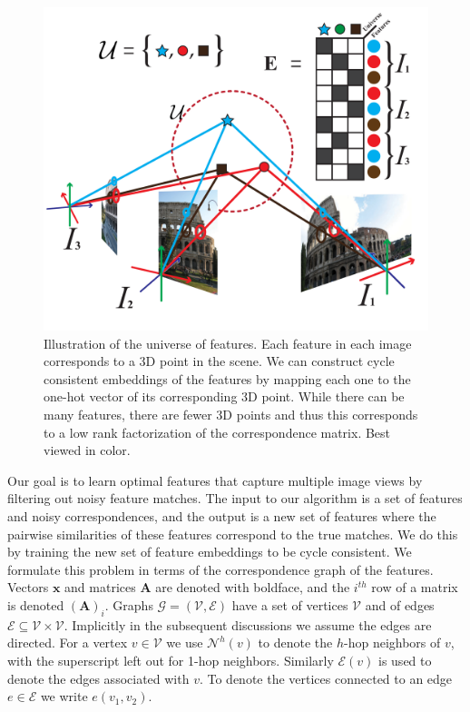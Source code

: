 \documentclass[10pt,twocolumn,letterpaper]{article}
\newcommand{\mat}[1]{\mathbf{#1}}
\begin{document}
\begin{figure}[t]
\begin{center}
  \includegraphics[width=0.9\linewidth]{figures-UniverseOfFeatures-v2.pdf}
\end{center}
  \caption{
    Illustration of the universe of features.
    Each feature in each image corresponds to a 3D point in the scene.
    We can construct cycle consistent embeddings of the features by mapping each one to the one-hot vector of its corresponding 3D point.
    While there can be many features, there are fewer 3D points and thus this corresponds to a low rank factorization of the correspondence matrix.
    Best viewed in color.
  }
\label{fig:universefeatures}
\label{fig:onecol}
\end{figure}
Our goal is to learn optimal features that capture multiple image views by filtering out noisy feature matches.
The input to our algorithm is a set of features and noisy correspondences, and the output is a new set of features where the pairwise similarities of these features correspond to the true matches.
We do this by training the new set of feature embeddings to be cycle consistent.
We formulate this problem in terms of the correspondence graph of the features.
Vectors $\mat{x}$ and matrices $\mat{A}$ are denoted with boldface, and the $i^{th}$ row of a matrix is denoted $(\mat{A})_i$.
Graphs $\mathcal{G} = (\mathcal{V}, \mathcal{E})$ have a set of vertices $\mathcal{V}$ and of edges $\mathcal{E} \subseteq \mathcal{V} \times \mathcal{V}$.
Implicitly in the subsequent discussions we assume the edges are directed.
For a vertex $v \in \mathcal{V}$ we use $\mathcal{N}^{h}(v)$ to denote the $h$-hop neighbors of $v$, with the superscript left out for 1-hop neighbors.
Similarly $\mathcal{E}(v)$ is used to denote the edges associated with $v$.
To denote the vertices connected to an edge $e \in \mathcal{E}$ we write $e(v_1, v_2)$.
\end{document}
